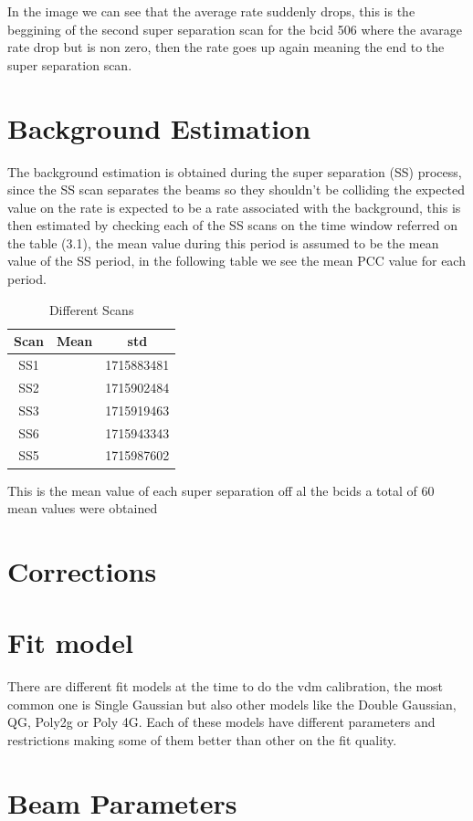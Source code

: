 In the image we can see that the average rate suddenly drops, this is the beggining of the second super separation scan for the bcid 506 where the avarage rate drop but is non zero, then the rate goes up again meaning the end to the super separation scan.  

\section{Background Estimation}

The background estimation is obtained during the super separation (SS) process, since the SS scan separates the beams so they shouldn't be colliding the expected value on the rate is expected to be a rate associated with the background, this is then estimated by checking each of the SS scans on the time window referred on the table (3.1), the mean value during this period is assumed to be the mean value of the SS period, in the following table we see the mean PCC value for each period.  

\begin{table} [H]
\begin{center}
\caption{Different Scans}
\begin{tabular}{|c c c|} 
 \hline
 Scan & Mean & std  \\ [0.5ex] 
 \hline\hline
 SS1 &  & 1715883481  \\ 
 \hline
 SS2 &  & 1715902484  \\
 \hline
 SS3 &  & 1715919463 \\
 \hline
 SS6 &  & 1715943343  \\
 \hline
 SS5 &  & 1715987602  \\ [1.0ex]
 \hline
\end{tabular}
\end{center}
\end{table}

This is the mean value of each super separation off al the bcids a total of 60 mean values were obtained 


\section{Corrections}

\section{Fit model} 

There are different fit models at the time to do the vdm calibration, the most common one is Single Gaussian but also other models like the Double Gaussian, QG, Poly2g or Poly 4G. Each of these models have different parameters and restrictions making some of them better than other on the fit quality. 


\section{Beam Parameters}




